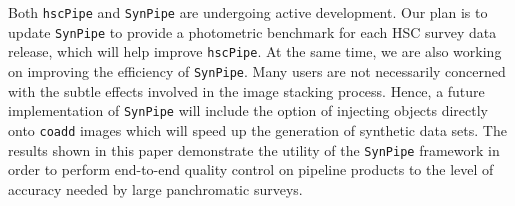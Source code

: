 \documentclass[useamsfonts]{pasj01}
\def\hscpipe{\texttt{hscPipe}}
\def\synpipe{\texttt{SynPipe}}
\def\coadd{\texttt{coadd}}
\begin{document}
    Both \hscpipe{} and \synpipe{} are undergoing active development. 
    Our plan is to update \synpipe{} to provide a photometric benchmark for
    each HSC survey data release, which will help improve \hscpipe{}.
    At the same time, we are also working on improving the efficiency of \synpipe{}.
    Many users are not necessarily concerned with the subtle effects involved in 
    the image stacking process. 
    Hence, a future implementation of \synpipe{} will include the option of injecting 
    objects directly onto \coadd{} images which will speed up the generation of 
    synthetic data sets. 
    The results shown in this paper demonstrate the utility of the \synpipe{} framework
    in order to perform end-to-end quality control on pipeline products to the level 
    of accuracy needed by large panchromatic surveys. 

\end{document}
